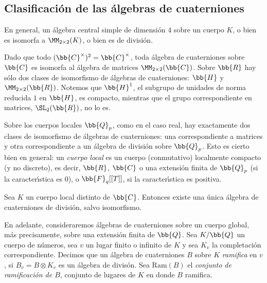 \subsection{Clasificaci\'{o}n de las \'{a}lgebras de cuaterniones}
En general, un \'{a}lgebra central simple de dimensi\'{o}n $4$ sobre
un cuerpo $K$, o bien es isomorfa a $\MM_{2\times 2}(K)$, o bien es de
divisi\'{o}n.

Dado que todo $(\bb{C}^{\times})^{2}=\bb{C}^{\times}$, toda \'{a}lgebra de
cuaterniones sobre $\bb{C}$ es isomorfa al \'{a}lgebra de matrices
$\MM_{2\times 2}(\bb{C})$. Sobre $\bb{R}$ hay s\'{o}lo dos clases de
isomorfismo de \'{a}lgebras de cuaterniones: $\bb{H}$ y
$\MM_{2\times 2}(\bb{R})$. Notemos que $\bb{H}^{1}$, el subgrupo de unidades
de norma reducida $1$ en $\bb{H}$, es compacto, mientras que
el grupo correspondiente en matrices, $\SL_{2}(\bb{R})$, no lo es.

Sobre los cuerpos locales $\bb{Q}_{p}$, como en el caso real, hay
exactamente dos clases de isomorfismo de \'{a}lgebras de cuaterniones:
una correspondiente a matrices y otra correspondiente a un \'{a}lgebra de
divisi\'{o}n sobre $\bb{Q}_{p}$. Esto es cierto bien en general:
un \emph{cuerpo local}
es un cuerpo (conmutativo) localmente compacto
(y no discreto), es decir, $\bb{R}$, $\bb{C}$ o una extensi\'{o}n
finita de $\bb{Q}_{p}$ (si la caracter\'{\i}stica es $0$), o $\bb{F}_{q}[[T]]$,
si la caracter\'{\i}stica es positiva.

\begin{teoClassificationSurUnCorpsLocal}
 \label{thm:clasificacionlocal}
 Sea $K$ un cuerpo local distinto de $\bb{C}$. Entonces existe una \'{u}nica
 \'{a}lgebra de cuaterniones de divisi\'{o}n, salvo isomorfismo.
\end{teoClassificationSurUnCorpsLocal}

En adelante, consideraremos \'{a}lgebras de cuaterniones sobre un cuerpo
global, m\'{a}s precisamente, sobre una extensi\'{o}n finita de $\bb{Q}$.
Sea $K/\bb{Q}$ un cuerpo de n\'{u}meros, sea $v$ un lugar finito o infinito
de $K$ y sea $K_{v}$ la completaci\'{o}n correspondiente.
Decimos que un \'{a}lgebra de cuaterniones $B$ sobre $K$ \emph{ramifica}
en $v$, si $B_{v}=B\otimes K_{v}$ es un \'{a}lgebra de divis\'{o}n.
Sea $\mathrm{Ram}(B)$ el \emph{conjunto de ramificaci\'{o}n de $B$},
conjunto de lugares de $K$ en donde $B$ ramifica.

